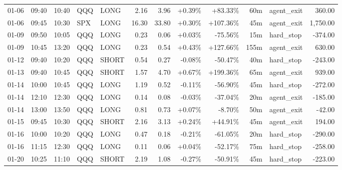 \documentclass[11pt,a4paper,twoside]{article}
\begin{document}
\begin{center}
\begin{longtable}{>{\color{txtmain}}l l l l l r r r r r >{\color{txtmain}}l r}
01-06 & 09:40 & 10:40 & QQQ & LONG & 2.16 & 3.96 & \textcolor{wingreen}{+0.39\%} & \textcolor{wingreen}{+83.33\%} & 60m & agent\_exit & \textcolor{wingreen}{360.00} \\
01-06 & 09:45 & 10:30 & SPX & LONG & 16.30 & 33.80 & \textcolor{wingreen}{+0.30\%} & \textcolor{wingreen}{+107.36\%} & 45m & agent\_exit & \textcolor{wingreen}{1,750.00} \\
01-09 & 09:50 & 10:05 & QQQ & LONG & 0.23 & 0.06 & \textcolor{wingreen}{+0.03\%} & \textcolor{lossred}{-75.56\%} & 15m & hard\_stop & \textcolor{lossred}{-374.00} \\
01-09 & 10:45 & 13:20 & QQQ & LONG & 0.23 & 0.54 & \textcolor{wingreen}{+0.43\%} & \textcolor{wingreen}{+127.66\%} & 155m & agent\_exit & \textcolor{wingreen}{630.00} \\
01-12 & 09:40 & 10:20 & QQQ & SHORT & 0.54 & 0.27 & \textcolor{lossred}{-0.08\%} & \textcolor{lossred}{-50.47\%} & 40m & hard\_stop & \textcolor{lossred}{-243.00} \\
01-13 & 09:40 & 10:45 & QQQ & SHORT & 1.57 & 4.70 & \textcolor{wingreen}{+0.67\%} & \textcolor{wingreen}{+199.36\%} & 65m & agent\_exit & \textcolor{wingreen}{939.00} \\
01-14 & 10:00 & 10:45 & QQQ & LONG & 1.19 & 0.52 & \textcolor{lossred}{-0.11\%} & \textcolor{lossred}{-56.90\%} & 45m & hard\_stop & \textcolor{lossred}{-272.00} \\
01-14 & 12:10 & 12:30 & QQQ & LONG & 0.14 & 0.08 & \textcolor{lossred}{-0.03\%} & \textcolor{lossred}{-37.04\%} & 20m & agent\_exit & \textcolor{lossred}{-185.00} \\
01-14 & 13:00 & 13:50 & QQQ & LONG & 0.81 & 0.73 & \textcolor{wingreen}{+0.07\%} & \textcolor{lossred}{-8.70\%} & 50m & agent\_exit & \textcolor{lossred}{-42.00} \\
01-15 & 09:45 & 10:30 & QQQ & SHORT & 2.16 & 3.13 & \textcolor{wingreen}{+0.24\%} & \textcolor{wingreen}{+44.91\%} & 45m & agent\_exit & \textcolor{wingreen}{194.00} \\
01-16 & 10:00 & 10:20 & QQQ & LONG & 0.47 & 0.18 & \textcolor{lossred}{-0.21\%} & \textcolor{lossred}{-61.05\%} & 20m & hard\_stop & \textcolor{lossred}{-290.00} \\
01-16 & 11:15 & 12:30 & QQQ & LONG & 0.11 & 0.06 & \textcolor{wingreen}{+0.04\%} & \textcolor{lossred}{-52.17\%} & 75m & hard\_stop & \textcolor{lossred}{-258.00} \\
01-20 & 10:25 & 11:10 & QQQ & SHORT & 2.19 & 1.08 & \textcolor{lossred}{-0.27\%} & \textcolor{lossred}{-50.91\%} & 45m & hard\_stop & \textcolor{lossred}{-223.00} \\

\end{longtable}
\end{center}
\end{document}
